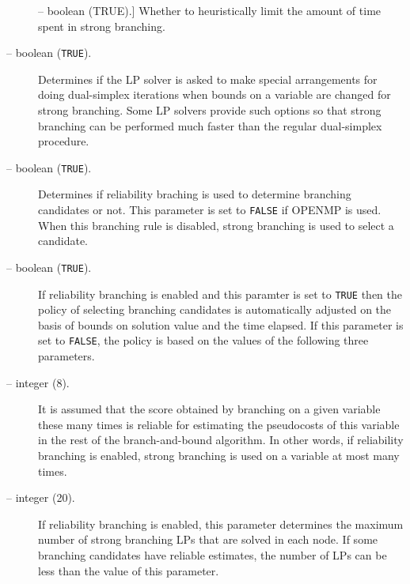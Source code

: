 \begin{description}
\item[] -- boolean (TRUE).]
Whether to heuristically limit the amount of time spent in strong branching.

\item [ -- boolean ({\tt TRUE}).]
Determines if the LP solver is asked to make special arrangements for doing
dual-simplex iterations when bounds on a variable are changed for strong
branching. Some LP solvers provide such options so that strong branching can
be performed much faster than the regular dual-simplex procedure.

\item[ -- boolean ({\tt TRUE}).] 
Determines if reliability braching is used to determine branching candidates
or not. This parameter is set to {\tt FALSE} if OPENMP is used. When this
branching rule is disabled, strong branching is used to select a candidate.


\item[ -- boolean ({\tt TRUE}).]
If reliability branching is enabled and this paramter is set to {\tt TRUE} then the
policy of selecting branching candidates is automatically adjusted on the
basis of bounds on solution value and the time elapsed. If this parameter is
set to {\tt FALSE}, the policy is based on the values of the following three
parameters.

\item[ -- integer (8).] 
It is assumed that the score obtained by branching on a given variable these many
times is reliable for estimating the pseudocosts of this variable in the rest
of the branch-and-bound algorithm. In other words, if reliability branching is
enabled, strong branching is used on a variable at most
 many times.

\item[ -- integer (20).] 
If reliability branching is enabled, this parameter determines the maximum
number of strong branching LPs that are solved in each node. If some branching
candidates have reliable estimates, the number of LPs can be less than
the value of this parameter.


\end{description}
